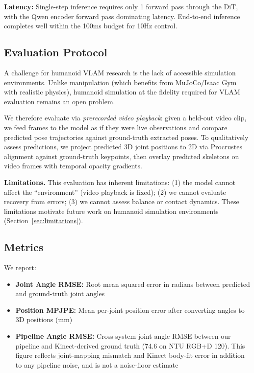 \documentclass[letterpaper, 10pt, conference]{ieeeconf}
\begin{document}
\textbf{Latency:} Single-step inference requires only 1 forward pass through the DiT, with the Qwen encoder forward pass dominating latency. End-to-end inference completes well within the 100ms budget for 10Hz control.

\subsection{Evaluation Protocol}
\label{sec:viz}

A challenge for humanoid VLAM research is the lack of accessible simulation environments. Unlike manipulation (which benefits from MuJoCo/Isaac Gym with realistic physics), humanoid simulation at the fidelity required for VLAM evaluation remains an open problem.

We therefore evaluate via \emph{prerecorded video playback}: given a held-out video clip, we feed frames to the model as if they were live observations and compare predicted pose trajectories against ground-truth extracted poses. To qualitatively assess predictions, we project predicted 3D joint positions to 2D via Procrustes alignment against ground-truth keypoints, then overlay predicted skeletons on video frames with temporal opacity gradients.

\textbf{Limitations.} This evaluation has inherent limitations: (1) the model cannot affect the ``environment'' (video playback is fixed); (2) we cannot evaluate recovery from errors; (3) we cannot assess balance or contact dynamics. These limitations motivate future work on humanoid simulation environments (Section~\ref{sec:limitations}).

\subsection{Metrics}

We report:
\begin{itemize}
    \item \textbf{Joint Angle RMSE:} Root mean squared error in radians between predicted and ground-truth joint angles
    \item \textbf{Position MPJPE:} Mean per-joint position error after converting angles to 3D positions (mm)
    \item \textbf{Pipeline Angle RMSE:} Cross-system joint-angle RMSE between our pipeline and Kinect-derived ground truth (74.6\textdegree{} on NTU RGB+D 120). This figure reflects joint-mapping mismatch and Kinect body-fit error in addition to any pipeline noise, and is not a noise-floor estimate
\end{itemize}
\end{document}
